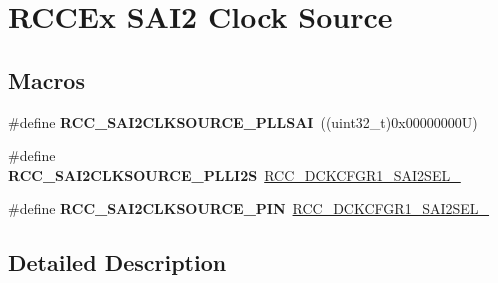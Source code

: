 \hypertarget{group___r_c_c_ex___s_a_i2___clock___source}{}\section{R\+C\+C\+Ex S\+A\+I2 Clock Source}
\label{group___r_c_c_ex___s_a_i2___clock___source}
\subsection*{Macros}
\begin{DoxyCompactItemize}
\item 
\mbox{\label{group___r_c_c_ex___s_a_i2___clock___source_ga67bde078276b61538dfda6a109341baf}} 
\#define {\bfseries R\+C\+C\+\_\+\+S\+A\+I2\+C\+L\+K\+S\+O\+U\+R\+C\+E\+\_\+\+P\+L\+L\+S\+AI}~((uint32\+\_\+t)0x00000000\+U)
\item 
\mbox{\label{group___r_c_c_ex___s_a_i2___clock___source_gad19397ddc9049869dc7b8f3eb7f3aa1a}} 
\#define {\bfseries R\+C\+C\+\_\+\+S\+A\+I2\+C\+L\+K\+S\+O\+U\+R\+C\+E\+\_\+\+P\+L\+L\+I2S}~\mbox{\hyperlink{group___peripheral___registers___bits___definition_ga1697f41eb3f753004626e3deddc06f4e}{R\+C\+C\+\_\+\+D\+C\+K\+C\+F\+G\+R1\+\_\+\+S\+A\+I2\+S\+E\+L\+\_}}
\item 
\mbox{\label{group___r_c_c_ex___s_a_i2___clock___source_ga30c62785a27705f182090d04b147dc3d}} 
\#define {\bfseries R\+C\+C\+\_\+\+S\+A\+I2\+C\+L\+K\+S\+O\+U\+R\+C\+E\+\_\+\+P\+IN}~\mbox{\hyperlink{group___peripheral___registers___bits___definition_ga97c29fe3af36d92cc0c96ea9fce0f71a}{R\+C\+C\+\_\+\+D\+C\+K\+C\+F\+G\+R1\+\_\+\+S\+A\+I2\+S\+E\+L\+\_}}
\end{DoxyCompactItemize}


\subsection{Detailed Description}
